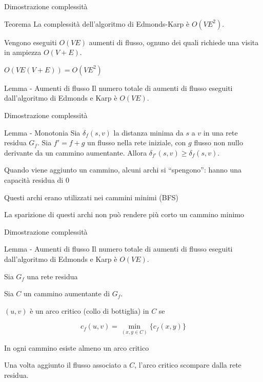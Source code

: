\begin{frame}{Dimostrazione complessità}

\vspace{-9pt}
\begin{block}{Teorema}
La complessità dell'algoritmo di Edmonds-Karp è $O(VE^2)$.
\end{block}
\BIL
\item Vengono eseguiti $O(VE)$ aumenti di flusso, ognuno dei quali richiede
una visita in ampiezza $O(V+E)$.
\item $O(VE(V+E)) = O(VE^2)$
\EIL

\begin{block}{Lemma - Aumenti di flusso}
Il numero totale di aumenti di flusso eseguiti dall'algoritmo
di Edmonds e Karp è $O(VE)$.
\end{block}

\end{frame}

\begin{frame}{Dimostrazione complessità}

\vspace{-9pt}
\begin{block}{Lemma - Monotonia}
Sia $\delta_f(s,v)$ la distanza minima da $s$ a $v$ in una rete residua $G_f$.
Sia $f' = f+g$ un flusso nella rete iniziale, con $g$ flusso non nullo derivante
da un cammino aumentante. Allora $\delta_{f'}(s,v) \geq \delta_f(s,v)$.
\end{block}  
\BIL
  \item Quando viene aggiunto un cammino, alcuni archi si  ``spengono'': hanno una capacità residua di 0
  \item Questi archi erano utilizzati nei cammini minimi (BFS)
  \item La sparizione di questi archi non può rendere più corto un cammino minimo
\EIL

\end{frame}

\begin{frame}{Dimostrazione complessità}

\vspace{-9pt}
\begin{block}{Lemma - Aumenti di flusso}
Il numero totale di aumenti di flusso eseguiti dall'algoritmo
di Edmonds e Karp è $O(VE)$.
\end{block}

\BIL
\item Sia $G_f$ una rete residua
\item Sia $C$ un cammino aumentante di $G_f$. 
\item $(u,v)$ è un arco \alert{critico} (collo di bottiglia) in $C$ se 

\[
c_f(u,v) = \min_{(x,y \in C)} \{ c_f(x,y) \}
\]

\item In ogni cammino esiste almeno un arco critico
\item Una volta aggiunto il flusso associato a $C$, l'arco critico scompare dalla rete residua. 
\EIL

\end{frame}

